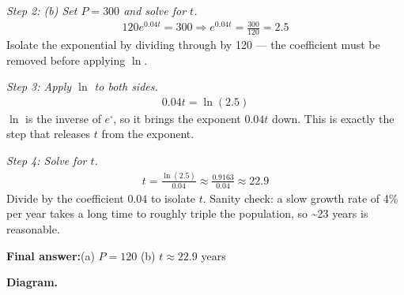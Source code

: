 \documentclass[11pt]{article}
\begin{document}
\textit{Step 2: (b) Set \( P = 300 \) and solve for \( t \).}
\[\begin{gathered}
120e^{0.04t} = 300 \Rightarrow e^{0.04t} = \frac{300}{120} = 2.5
\end{gathered}\]
Isolate the exponential by dividing through by 120 --- the coefficient must be removed before applying \( \ln \).

\textit{Step 3: Apply \( \ln \) to both sides.}
\[\begin{gathered}
0.04t = \ln(2.5)
\end{gathered}\]
\( \ln \) is the inverse of \( e^{\square} \), so it brings the exponent \( 0.04t \) down. This is exactly the step that releases \( t \) from the exponent.

\textit{Step 4: Solve for \( t \).}
\[\begin{gathered}
t = \frac{\ln(2.5)}{0.04} \approx \frac{0.9163}{0.04} \approx 22.9
\end{gathered}\]
Divide by the coefficient \( 0.04 \) to isolate \( t \). Sanity check: a slow growth rate of 4\% per year takes a long time to roughly triple the population, so \textasciitilde 23 years is reasonable.

\begin{answerbox}
\textbf{Final answer:}\quad (a) \(\displaystyle  P = 120 \) \quad  (b) \(\displaystyle  t \approx 22.9 \) years
\end{answerbox}
\textbf{Diagram.}
\end{document}
